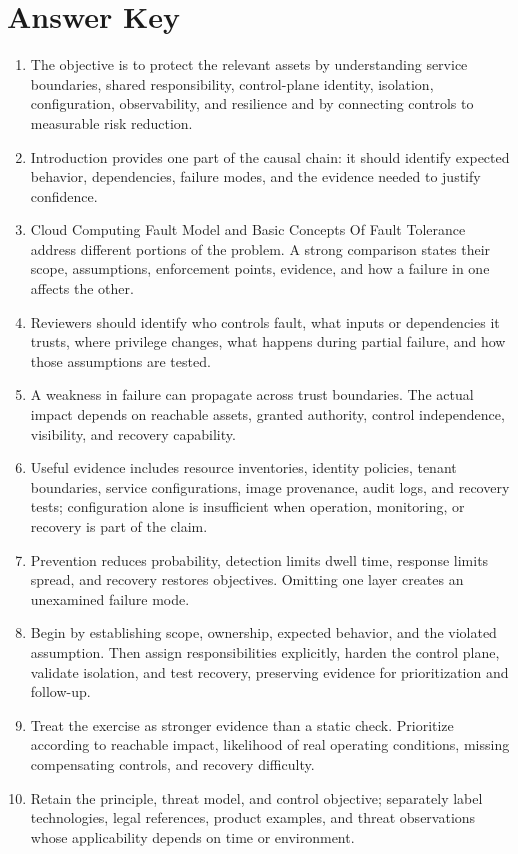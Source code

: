\documentclass[11pt,letterpaper]{article}
\begin{document}
\section*{Answer Key}
\begin{enumerate}
\item The objective is to protect the relevant assets by understanding service boundaries, shared responsibility, control-plane identity, isolation, configuration, observability, and resilience and by connecting controls to measurable risk reduction.
\item Introduction provides one part of the causal chain: it should identify expected behavior, dependencies, failure modes, and the evidence needed to justify confidence.
\item Cloud Computing Fault Model and Basic Concepts Of Fault Tolerance address different portions of the problem. A strong comparison states their scope, assumptions, enforcement points, evidence, and how a failure in one affects the other.
\item Reviewers should identify who controls fault, what inputs or dependencies it trusts, where privilege changes, what happens during partial failure, and how those assumptions are tested.
\item A weakness in failure can propagate across trust boundaries. The actual impact depends on reachable assets, granted authority, control independence, visibility, and recovery capability.
\item Useful evidence includes resource inventories, identity policies, tenant boundaries, service configurations, image provenance, audit logs, and recovery tests; configuration alone is insufficient when operation, monitoring, or recovery is part of the claim.
\item Prevention reduces probability, detection limits dwell time, response limits spread, and recovery restores objectives. Omitting one layer creates an unexamined failure mode.
\item Begin by establishing scope, ownership, expected behavior, and the violated assumption. Then assign responsibilities explicitly, harden the control plane, validate isolation, and test recovery, preserving evidence for prioritization and follow-up.
\item Treat the exercise as stronger evidence than a static check. Prioritize according to reachable impact, likelihood of real operating conditions, missing compensating controls, and recovery difficulty.
\item Retain the principle, threat model, and control objective; separately label technologies, legal references, product examples, and threat observations whose applicability depends on time or environment.
\end{enumerate}
\end{document}
